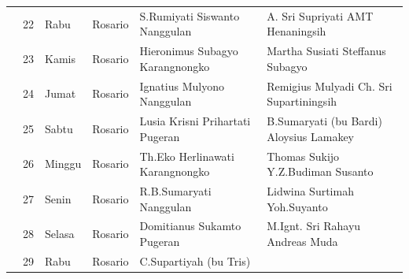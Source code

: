\documentclass{article}
\begin{document}
\begin{flushleft}
\begin{supertabular}{m{1.5439999cm}m{0.753cm}m{1.229cm}m{2.672cm}m{3.434cm}m{3.4199998cm}}
 &
22 &
Rabu &
Rosario &
S.Rumiyati Siswanto Nanggulan &
A. Sri Supriyati  AMT Henaningsih\\
 &
23 &
Kamis &
Rosario &
Hieronimus Subagyo Karangnongko &
Martha Susiati  Steffanus Subagyo\\
 &
24 &
Jumat &
Rosario &
Ignatius Mulyono Nanggulan &
Remigius Mulyadi  Ch. Sri Supartiningsih\\
 &
25 &
Sabtu &
Rosario &
Lusia Krisni Prihartati Pugeran &
B.Sumaryati (bu Bardi) Aloysius Lamakey\\
 &
26 &
Minggu &
Rosario &
Th.Eko Herlinawati  Karangnongko &
Thomas Sukijo  Y.Z.Budiman Susanto\\
 &
27 &
Senin &
Rosario &
R.B.Sumaryati  Nanggulan &
Lidwina Surtimah  Yoh.Suyanto\\
 &
28 &
Selasa &
Rosario &
Domitianus Sukamto Pugeran &
M.Ignt. Sri Rahayu  Andreas Muda\\
 &
29 &
Rabu &
Rosario &
C.Supartiyah (bu Tris)


\end{supertabular}
\end{flushleft}
\end{document}
